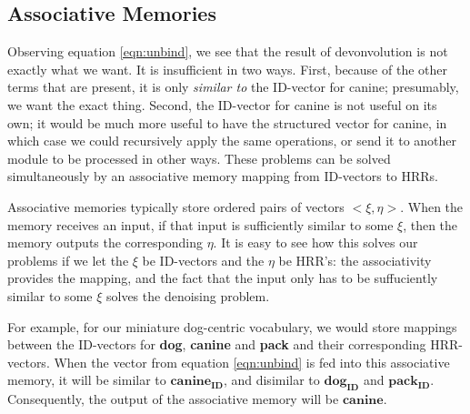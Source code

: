 \documentclass[10pt,letterpaper]{article}
\begin{document}
%
%

\subsection{Associative Memories}
Observing equation \eqref{eqn:unbind}, we see that the result of devonvolution is not exactly what we want. It is insufficient in two ways. First, because of the other terms that are present, it is only \textit{similar to} the ID-vector for canine; presumably, we want the exact thing. Second, the ID-vector for canine is not useful on its own; it would be much more useful to have the structured vector for canine, in which case we could recursively apply the same operations, or send it to another module to be processed in other ways. These problems can be solved simultaneously by an associative memory mapping from ID-vectors to HRRs.

Associative memories typically store ordered pairs of vectors $<\xi, \eta>$. When the memory receives an input, if that input is sufficiently similar to some $\xi$, then the memory outputs the corresponding $\eta$. It is easy to see how this solves our problems if we let the $\xi$ be ID-vectors and the $\eta$ be HRR's: the associativity provides the mapping, and the fact that the input only has to be suffuciently similar to some $\xi$ solves the denoising problem. 

For example, for our miniature dog-centric vocabulary, we would store mappings between the ID-vectors for \textbf{dog}, \textbf{canine} and \textbf{pack} and their corresponding HRR-vectors. When the vector from equation \eqref{eqn:unbind} is fed into this associative memory, it will be similar to $\mathbf{canine_{ID}}$, and disimilar to $\mathbf{dog_{ID}}$ and $\mathbf{pack_{ID}}$. Consequently, the output of the associative memory will be $\mathbf{canine}$. 
\end{document}
